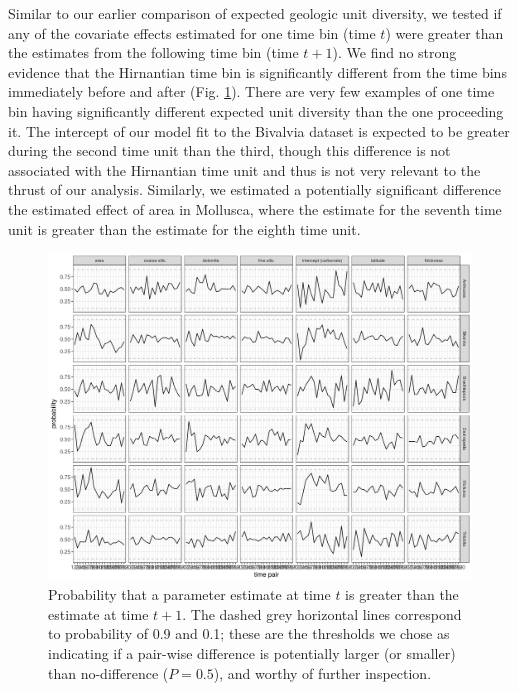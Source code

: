 \documentclass[12pt,letterpaper]{article}
\begin{document}
Similar to our earlier comparison of expected geologic unit diversity, we tested if any of the covariate effects estimated for one time bin (time \(t\)) were greater than the estimates from the following time bin (time \(t + 1\)). We find no strong evidence that the Hirnantian time bin is significantly different from the time bins immediately before and after (Fig. \ref{fig:diff_cov}). %
There are very few examples of one time bin having significantly different expected unit diversity than the one proceeding it. The intercept of our model fit to the Bivalvia dataset is expected to be greater during the second time unit than the third, though this difference is not associated with the Hirnantian time unit and thus is not very relevant to the thrust of our analysis. Similarly, we estimated a potentially significant difference the estimated effect of area in Mollusca, where the estimate for the seventh time unit is greater than the estimate for the eighth time unit.
\begin{figure}[ht]
  \centering
  \includegraphics[width=\textwidth,height=0.5\textheight,keepaspectratio=true]{figure/cov_diff_diversity}
  \caption{Probability that a parameter estimate at time \(t\) is greater than the estimate at time \(t + 1\). The dashed grey horizontal lines correspond to probability of 0.9 and 0.1; these are the thresholds we chose as indicating if a pair-wise difference is potentially larger (or smaller) than no-difference (\(P = 0.5\)), and worthy of further inspection.}
  \label{fig:diff_cov}
\end{figure}
\end{document}
